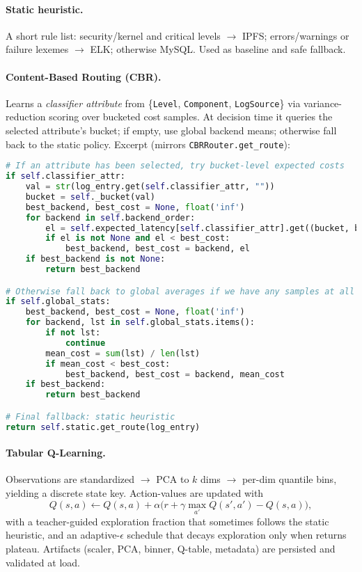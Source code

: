 \paragraph{Static heuristic.} A short rule list: security/kernel and critical levels $\to$ IPFS; errors/warnings or failure lexemes $\to$ ELK; otherwise MySQL. Used as baseline and safe fallback.

\paragraph{Content-Based Routing (CBR).} Learns a \emph{classifier attribute} from \{\texttt{Level}, \texttt{Component}, \texttt{LogSource}\} via variance-reduction scoring over bucketed cost samples. At decision time it queries the selected attribute’s bucket; if empty, use global backend means; otherwise fall back to the static policy. Excerpt (mirrors \texttt{CBRRouter.get\_route}):

\begin{lstlisting}[language=Python, caption={CBR fallback (excerpt from src/routers.py)}]
# If an attribute has been selected, try bucket-level expected costs
if self.classifier_attr:
    val = str(log_entry.get(self.classifier_attr, ""))
    bucket = self._bucket(val)
    best_backend, best_cost = None, float('inf')
    for backend in self.backend_order:
        el = self.expected_latency[self.classifier_attr].get((bucket, backend))
        if el is not None and el < best_cost:
            best_backend, best_cost = backend, el
    if best_backend is not None:
        return best_backend

# Otherwise fall back to global averages if we have any samples at all
if self.global_stats:
    best_backend, best_cost = None, float('inf')
    for backend, lst in self.global_stats.items():
        if not lst:
            continue
        mean_cost = sum(lst) / len(lst)
        if mean_cost < best_cost:
            best_backend, best_cost = backend, mean_cost
    if best_backend:
        return best_backend

# Final fallback: static heuristic
return self.static.get_route(log_entry)
\end{lstlisting}

\paragraph{Tabular Q-Learning.} Observations are standardized $\to$ PCA to $k$ dims $\to$ per-dim quantile bins, yielding a discrete state key. Action-values are updated with
\[
Q(s,a) \leftarrow Q(s,a) + \alpha\big(r + \gamma\max_{a'} Q(s',a') - Q(s,a)\big),
\]
with a teacher-guided exploration fraction that sometimes follows the static heuristic, and an adaptive-$\epsilon$ schedule that decays exploration only when returns plateau. Artifacts (scaler, PCA, binner, Q-table, metadata) are persisted and validated at load.

